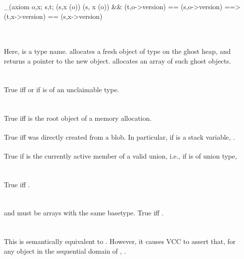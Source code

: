 \documentclass[preprint,nocopyrightspace]{sigplanconf}
\begin{document}
{\begin{VCC}
  _(axiom \forall \object o,x; \forall \state s,t; 
             {\at(s,x \in \domain(o))}
             \at(s, x \in \domain(o)) && \at(t,o->version) == \at(s,o->version) 
             ==> \at(t,x->version) == \at(s,x->version)
\end{VCC}

\\
\\
Here,  is a type name.  allocates a fresh object
of type  on the ghost heap, and returns a pointer to the new
object.  allocates an array of  such
ghost objects.
\\\\
\\
True iff  or if  is of an unclaimable type.
\\\\
\\
True iff  is the root object of a memory allocation.
\\
\\
True iff  was directly created from a blob. In particular,
if  is a stack variable, . 
\\
\\
True if  is the currently active member of a valid union, i.e.,
if  is of union type, 
\\\\
\\
True iff .
\\\\
\\
 and  must be arrays with the same basetype.
True iff .
\\\\
\\
This is semantically equivalent to . However, it
causes VCC to assert that, for any object  in the sequential
domain of , .
\\\\
}
\end{document}
